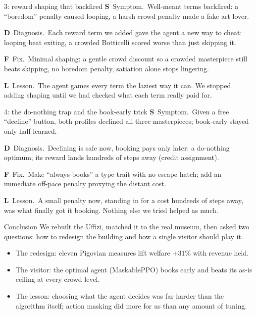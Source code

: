 \documentclass[aspectratio=169, 11pt, t]{beamer}
\newcommand{\good}[1]{\textcolor{safegreen}{#1}}
\newcommand{\warn}[1]{\textcolor{warnorange}{#1}}
\newcommand{\bad}[1]{\textcolor{crowdred}{#1}}
\newcommand{\emp}[1]{#1}
\newcommand{\body}{\large}
\newcommand{\bodydense}{\small}
\newcommand{\sdfl}[4]{%
{\bad{\textbf{S}}\ \emp{Symptom.}\ #1}\par\vfill
{\warn{\textbf{D}}\ \emp{Diagnosis.}\ #2}\par\vfill
{\good{\textbf{F}}\ \emp{Fix.}\ #3}\par\vfill
{\textbf{L}\ \emp{Lesson.}\ #4}\par}
\begin{document}
\begin{frame}{3: reward shaping that backfired}
\bodydense
\sdfl
{Well-meant terms backfired: a ``boredom'' penalty caused \emp{looping}, a harsh crowd penalty made a
\emp{fake art lover}.}
{Each reward term we added gave the agent a new way to cheat: looping beat exiting, a crowded
Botticelli scored worse than just skipping it.}
{\emp{Minimal} shaping: a \emp{gentle} crowd discount so a crowded masterpiece still beats skipping,
no boredom penalty, satiation alone stops lingering.}
{The agent games every term the laziest way it can. We stopped adding shaping until we had checked
what each term really paid for.}
\end{frame}

\begin{frame}{4: the do-nothing trap and the book-early trick}
\bodydense
\sdfl
{Given a free ``decline'' button, \emp{both} profiles declined all three masterpieces; book-early
stayed only \emp{half} learned.}
{Declining is safe now, booking pays only later: a do-nothing optimum; its reward lands hundreds of
steps away (credit assignment).}
{Make ``always books'' a \emp{type trait} with no escape hatch; add an \emp{immediate off-pace
penalty} proxying the distant cost.}
{A small penalty now, standing in for a cost hundreds of steps away, was what finally got it booking.
Nothing else we tried helped as much.}
\end{frame}

\begin{frame}{Conclusion}
\body
We rebuilt the Uffizi, matched it to the real museum, then asked two questions: how to redesign the
building and how a single visitor should play it.
\vfill
\begin{itemize}\setlength\itemsep{0.7em}
\item \emp{The redesign:} eleven Pigovian measures lift welfare \good{$+31\%$} with revenue held.
\item \emp{The visitor:} the optimal agent (MaskablePPO) books early and beats its as-is ceiling at
every crowd level.
\item \emp{The lesson:} choosing what the agent decides was far harder than the algorithm itself;
action masking did more for us than any amount of tuning.
\end{itemize}
\end{frame}
\end{document}
